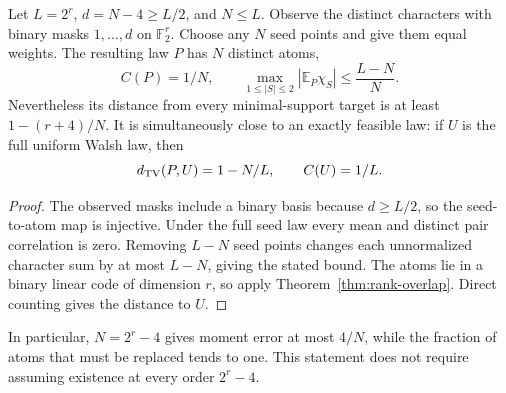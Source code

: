 \begin{proposition}
\label{prop:rank-walsh-candidate}
Let $L=2^r$, $d=N-4\ge L/2$, and $N\le L$. Observe the distinct
characters with binary masks $1,\ldots,d$ on $\mathbb F_2^r$.
Choose any $N$ seed points and give them equal weights. The resulting
law $P$ has $N$ distinct atoms,
\[
 C(P)=1/N,\qquad
 \max_{1\le|S|\le2}|\mathbb E_P\chi_S|\le\frac{L-N}{N}.
\]
Nevertheless its distance from every minimal-support target is at
least $1-(r+4)/N$.
It is simultaneously close to an exactly feasible law: if $U$ is
the full uniform Walsh law, then
\[
 d_{\rm TV}(P,U)=1-N/L,\qquad C(U)=1/L.
\]
\end{proposition}
\begin{proof}
The observed masks include a binary basis because $d\ge L/2$, so
the seed-to-atom map is injective. Under the full seed law every
mean and distinct pair correlation is zero. Removing $L-N$ seed
points changes each unnormalized character sum by at most $L-N$,
giving the stated bound. The atoms lie in a binary linear code of
dimension $r$, so apply Theorem~\ref{thm:rank-overlap}. Direct counting
gives the distance to $U$.
\end{proof}
In particular, $N=2^r-4$ gives moment error at most $4/N$, while the
fraction of atoms that must be replaced tends to one. This statement
does not require assuming existence at every order $2^r-4$.

